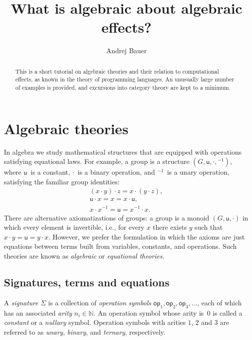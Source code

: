 \documentclass{amsart}
\newcommand{\NN}{\mathbb{N}}
\newcommand{\op}{\mathsf{op}}
\begin{document}
\title{What is algebraic about algebraic effects?}

\author{Andrej Bauer}

\begin{abstract}
  This is a short tutorial on algebraic theories and their relation to computational
  effects, as known in the theory of programming languages. An unusually large number of
  examples is provided, and excursions into category theory are kept to a minimum.
\end{abstract}

\maketitle

\section{Algebraic theories}
\label{sec:algebraic-theories}


In algebra we study mathematical structures that are equipped with operations satisfying
equational laws. For example, a group is a structure $(G, \mathsf{u}, {\cdot}, {}^{-1})$,
where $\mathsf{u}$~is a constant, $\cdot$~is a binary operation, and ${}^{-1}$~is a unary
operation, satisfying the familiar group identities:
%
\begin{gather*}
  (x \cdot y) \cdot z = x \cdot (y \cdot z),\\
  \mathsf{u} \cdot x = x = x \cdot \mathsf{u},\\
  x \cdot x^{-1} = \mathsf{u} = x^{-1} \cdot x.
\end{gather*}
%
There are alternative axiomatizations of groups: a group is a monoid
$(G, \mathsf{u}, {\cdot})$ in which every element is invertible, i.e., for every $x$ there
exists $y$ such that $x \cdot y = \mathsf{u} = y \cdot x$. However, we prefer the
formulation in which the axioms are just equations between terms built from variables,
constants, and operations. Such theories are known as \emph{algebraic} or \emph{equational
  theories}.

\subsection{Signatures, terms and equations}
\label{sec:signatures-equations}

A \emph{signature $\Sigma$} is a collection of \emph{operation symbols}
$\op_1, \op_2, \op_3, \ldots$, each of which has an associated \emph{arity} $n_i \in \NN$.
An operation symbol whose arity is~$0$ is called a \emph{constant} or a \emph{nullary}
symbol. Operation symbols with arities $1$, $2$ and $3$ are referred to as \emph{unary},
\emph{binary}, and \emph{ternary}, respectively.
\end{document}
